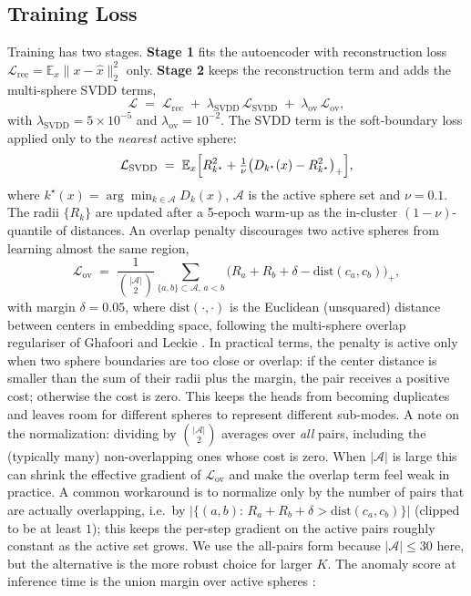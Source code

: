 \documentclass[conference]{IEEEtran}
\begin{document}
\subsection{Training Loss}
\label{sec:loss}
Training has two stages. \textbf{Stage 1} fits the autoencoder with reconstruction loss
\(\mathcal{L}_{\mathrm{rec}}=\mathbb{E}_{x}\|x-\hat{x}\|_{2}^{2}\) only. \textbf{Stage 2} keeps the reconstruction term and adds the multi-sphere SVDD terms,
\begin{equation}
\mathcal{L} \;=\; \mathcal{L}_{\mathrm{rec}} \;+\; \lambda_{\mathrm{SVDD}}\,\mathcal{L}_{\mathrm{SVDD}} \;+\; \lambda_{\mathrm{ov}}\,\mathcal{L}_{\mathrm{ov}},
\label{eq:total}
\end{equation}
with \(\lambda_{\mathrm{SVDD}}=5\times 10^{-5}\) and \(\lambda_{\mathrm{ov}}=10^{-2}\). The SVDD term is the soft-boundary loss \cite{ruff2018deep} applied only to the \emph{nearest} active sphere:
\begin{equation}
\mathcal{L}_{\mathrm{SVDD}} \;=\; \mathbb{E}_{x}\Bigl[R_{k^{\star}}^{2}+\tfrac{1}{\nu}\bigl(D_{k^{\star}}(x)-R_{k^{\star}}^{2}\bigr)_{+}\Bigr],
\label{eq:softboundary}
\end{equation}
where \(k^{\star}(x)\!=\!\arg\min_{k\in\mathcal{A}}D_{k}(x)\), \(\mathcal{A}\) is the active sphere set and \(\nu=0.1\). The radii \(\{R_{k}\}\) are updated after a 5-epoch warm-up as the in-cluster \((1-\nu)\)-quantile of distances. An overlap penalty discourages two active spheres from learning almost the same region,
\begin{equation}
\mathcal{L}_{\mathrm{ov}} \;=\; \frac{1}{\binom{|\mathcal{A}|}{2}}\sum_{\{a,b\}\subset\mathcal{A},\,a<b}\bigl(R_{a}+R_{b}+\delta-\mathrm{dist}(c_{a},c_{b})\bigr)_{+},
\label{eq:overlap}
\end{equation}
with margin \(\delta=0.05\), where \(\mathrm{dist}(\cdot,\cdot)\) is the Euclidean (unsquared) distance between centers in embedding space, following the multi-sphere overlap regulariser of Ghafoori and Leckie \cite{ghafoori2020deep}. In practical terms, the penalty is active only when two sphere boundaries are too close or overlap: if the center distance is smaller than the sum of their radii plus the margin, the pair receives a positive cost; otherwise the cost is zero. This keeps the heads from becoming duplicates and leaves room for different spheres to represent different sub-modes. A note on the normalization: dividing by \(\binom{|\mathcal{A}|}{2}\) averages over \emph{all} pairs, including the (typically many) non-overlapping ones whose cost is zero. When \(|\mathcal{A}|\) is large this can shrink the effective gradient of \(\mathcal{L}_{\mathrm{ov}}\) and make the overlap term feel weak in practice. A common workaround is to normalize only by the number of pairs that are actually overlapping, i.e.\ by \(|\{(a,b):\,R_a+R_b+\delta>\mathrm{dist}(c_a,c_b)\}|\) (clipped to be at least \(1\)); this keeps the per-step gradient on the active pairs roughly constant as the active set grows. We use the all-pairs form because \(|\mathcal{A}|\le 30\) here, but the alternative is the more robust choice for larger \(K\). The anomaly score at inference time is the union margin over active spheres \cite{ghafoori2020deep,ruff2018deep}:
\end{document}
